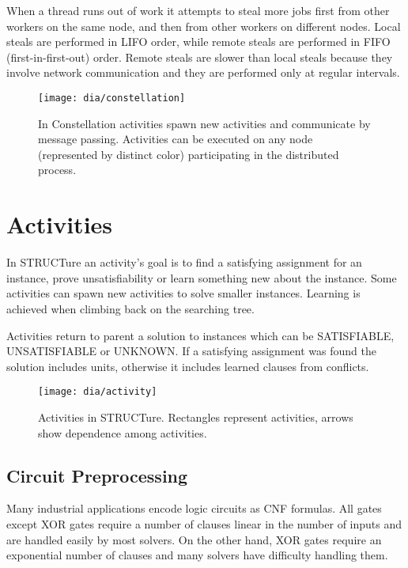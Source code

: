 When a thread runs out of work it attempts to steal more
jobs first from other workers on the same node, and then from
other workers on different nodes.  Local steals are performed
in LIFO order, while remote steals are performed in FIFO
(first-in-first-out) order. Remote steals are
slower than local steals because they involve network communication
and they are performed only at regular intervals.

\begin{figure}
  \centering
  \texttt{[image: dia/constellation]}
  \caption{In Constellation activities spawn new
  activities and communicate by message passing.
  Activities can be executed on any node (represented by
  distinct color) participating in the distributed process.}
  \label{fig:constellation}
\end{figure}


\section{Activities}

In STRUCTure an activity's goal is to find a satisfying assignment
for an instance, prove unsatisfiability or learn something new
about the instance. Some activities can spawn new activities to
solve smaller instances.  Learning is achieved when climbing back
on the searching tree.

Activities return to parent a solution to instances which can be
\textsf{SATISFIABLE}, \textsf{UNSATISFIABLE} or \textsf{UNKNOWN}. If
a satisfying assignment was found the solution includes units,
otherwise it includes learned clauses from conflicts.


\begin{figure}
  \centering
  \texttt{[image: dia/activity]}
  \caption{Activities in STRUCTure. Rectangles represent activities, arrows
  show dependence among activities.}
  \label{fig:activities}
\end{figure}


\subsection{Circuit Preprocessing}

Many industrial applications encode logic circuits as CNF formulas.
All gates except XOR gates require a number of clauses linear in
the number of inputs and are handled easily by most solvers. On
the other hand, XOR gates require an exponential number of clauses
and many solvers have difficulty handling them.

